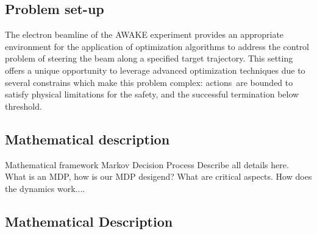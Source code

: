 \documentclass[journal,article,submit,pdftex,moreauthors]{Definitions/mdpi}
\begin{document}
\subsection{Problem set-up}
The electron beamline of the AWAKE experiment provides an appropriate environment for the application of optimization algorithms to address the control problem of steering the beam along a specified target trajectory. This setting offers a unique opportunity to leverage advanced optimization techniques due to several constrains which make this problem complex: actions are bounded to satisfy physical limitations for the safety, and the successful termination below threshold. 
\subsection{Mathematical description}
Mathematical framework Markov Decision Process Describe all details here. What is an MDP, how is our MDP desigend? What are critical aspects.
How does the dynamics work....
\subsection{Mathematical Description}
\end{document}
